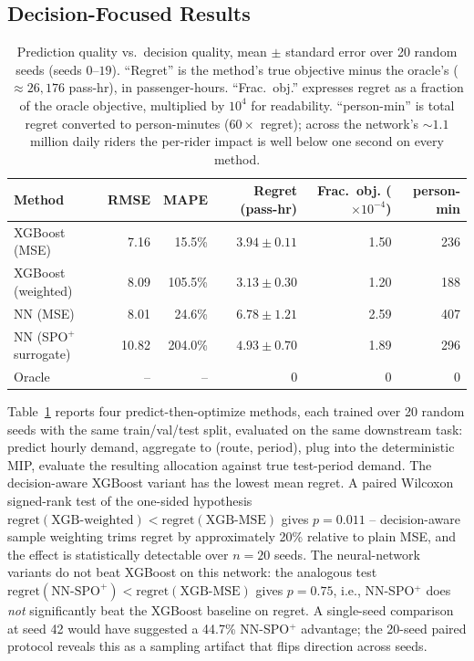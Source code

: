 \documentclass[a4paper,twoside]{article}
\begin{document}
\subsection{Decision-Focused Results}
\label{sec:df-results}

\begin{table}[t]
\caption{Prediction quality vs.\ decision quality, mean $\pm$
standard error over 20 random seeds (seeds $0$--$19$). ``Regret'' is
the method's true objective minus the oracle's ($\approx 26{,}176$
pass-hr), in passenger-hours. ``Frac.\ obj.'' expresses regret as a
fraction of the oracle objective, multiplied by $10^{4}$ for
readability. ``person-min'' is total regret converted to person-minutes
($60 \times$ regret); across the network's $\sim 1.1$ million daily
riders the per-rider impact is well below one second on every
method.}\label{tab:df}
\centering\footnotesize
\begin{tabular}{@{}lrrrrr@{}}
\toprule
\textbf{Method} & \textbf{RMSE} & \textbf{MAPE} &
\textbf{Regret (pass-hr)} & \textbf{Frac.\ obj.} ($\times 10^{-4}$) &
\textbf{person-min} \\
\midrule
XGBoost (MSE)          &  7.16 &  15.5\% & $3.94 \pm 0.11$ & 1.50 & 236 \\
XGBoost (weighted)     &  8.09 & 105.5\% & $\mathbf{3.13 \pm 0.30}$ & 1.20 & 188 \\
NN (MSE)               &  8.01 &  24.6\% & $6.78 \pm 1.21$ & 2.59 & 407 \\
NN (SPO$^+$ surrogate) & 10.82 & 204.0\% & $4.93 \pm 0.70$ & 1.89 & 296 \\
Oracle                 &  --   &   --    & 0               & 0    & 0 \\
\bottomrule
\end{tabular}
\end{table}

Table~\ref{tab:df} reports four predict-then-optimize methods,
each trained over 20 random seeds with the same train/val/test
split, evaluated on the same downstream task: predict hourly
demand, aggregate to (route, period), plug into the deterministic
MIP, evaluate the resulting allocation against true test-period
demand. The decision-aware XGBoost variant has the lowest mean
regret. A paired Wilcoxon signed-rank test
\cite{wilcoxon1945individual} of the one-sided hypothesis
$\mathrm{regret}(\text{XGB-weighted}) < \mathrm{regret}(\text{XGB-MSE})$
gives $p = 0.011$ -- decision-aware sample weighting trims
regret by approximately 20\% relative to plain MSE, and the
effect is statistically detectable over $n = 20$ seeds. The
neural-network variants do not beat XGBoost on this network: the
analogous test
$\mathrm{regret}(\text{NN-SPO}^+) < \mathrm{regret}(\text{XGB-MSE})$
gives $p = 0.75$, i.e., NN-SPO$^+$ does \emph{not} significantly
beat the XGBoost baseline on regret. A single-seed comparison at
seed 42 would have suggested a 44.7\% NN-SPO$^+$ advantage; the
20-seed paired protocol reveals this as a sampling artifact that
flips direction across seeds.
\end{document}
